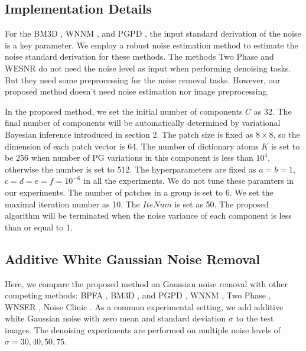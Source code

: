 \documentclass[runningheads]{llncs}
\begin{document}
\vspace{-0.15in}

\subsection{Implementation Details}
For the BM3D \cite{bm3d}, WNNM \cite{wnnm}, and PGPD \cite{pgpd}, the input standard derivation of the noise is a key parameter. We employ a robust noise estimation method \cite{liu2013single} to estimate the noise standard derivation for these methods. The methods Two Phase \cite{cai2010fast} and WESNR \cite{wesnr} do not need the noise level as input when performing denoising tasks. But they need some preprocessing for the noise removal tasks. However, our proposed method doesn't need noise estimation nor image preprocessing.

In the proposed method, we set the initial number of components $C$ as 32. The final number of components will be automatically determined by variational Bayesian inference introduced in section 2. The patch size is fixed as $8 \times 8$, so the dimension of each patch vector is 64. The number of dictionary atoms $K$ is set to be 256 when number of PG variations in this component is less than $10^4$, otherwise the number is set to 512. The hyperparameters are fixed as $a=b=1$, $c=d=e=f=10^{-6}$ in all the experiments. We do not tune these paramters in our experiments. The number of patches in a group is set to 6. We set the maximal iteration number as 10. The $IteNum$ is set as 50. The proposed algorithm will be terminated when the noise variance of each component is less than or equal to 1.

\vspace{-0.1in}

\subsection{Additive White Gaussian Noise Removal}
Here, we compare the proposed method on Gaussian noise removal with other competing methods: BPFA \cite{bpfa}, BM3D \cite{bm3d}, and PGPD \cite{pgpd}, WNNM \cite{wnnm}, Two Phase \cite{cai2010fast}, WNSER \cite{wesnr}, Noise Clinic \cite{noiseclinic}. As a common experimental setting, we add additive white Gaussian noise with zero mean and standard deviation $\sigma$ to the test images. The denoising experiments are performed on multiple noise levels of $\sigma = 30, 40, 50, 75$.
\end{document}
